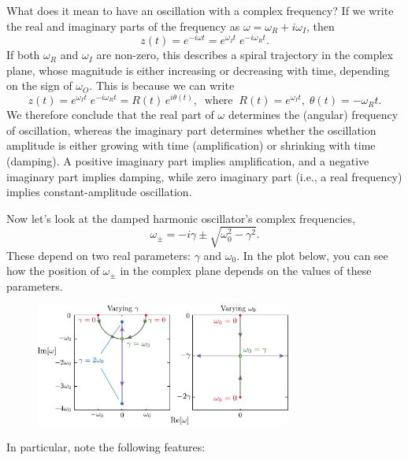 \documentclass[10pt,a4paper]{article}
\begin{document}
What does it mean to have an oscillation with a complex frequency? If we
write the real and imaginary parts of the frequency as
$\omega = \omega_R + i \omega_I$, then
\begin{equation}
z(t) = e^{-i\omega t} = e^{\omega_I t} \; e^{-i\omega_R t}.
\end{equation}
If both $\omega_R$ and $\omega_I$ are non-zero, this describes a
spiral trajectory in the complex plane, whose magnitude is either
increasing or decreasing with time, depending on the sign of
$\omega_O$. This is because we can write
\begin{equation}
z(t) = e^{\omega_I t} \; e^{-i\omega_R t} = R(t)\, e^{i\theta(t)}, \;\;\mathrm{where}\;\;R(t) = e^{\omega_I t}, \; \theta(t) = -\omega_R t.
\end{equation}
We therefore conclude that the real part of $\omega$ determines the
(angular) frequency of oscillation, whereas the imaginary part
determines whether the oscillation amplitude is either growing with time
(amplification) or shrinking with time (damping). A positive imaginary
part implies amplification, and a negative imaginary part implies
damping, while zero imaginary part (i.e., a real frequency) implies
constant-amplitude oscillation.

Now let's look at the damped harmonic oscillator's complex
frequencies,
\begin{equation}
\omega_\pm = -i\gamma \pm \sqrt{\omega_0^2 - \gamma^2}.
\end{equation}
These depend on two real parameters: $\gamma$ and $\omega_0$. In the
plot below, you can see how the position of $\omega_\pm$ in the
complex plane depends on the values of these parameters.

\begin{figure}[h]
  \centering\includegraphics[width=0.75\textwidth]{oscillator_frequencies}
\end{figure}

\noindent
In particular, note the following features:
\end{document}
